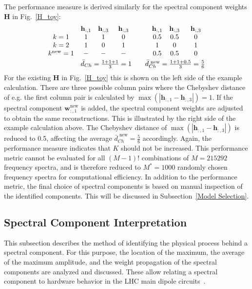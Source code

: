 \documentclass[lettersize,journal]{IEEEtran}
\begin{document}
The performance measure is derived similarly for the spectral component weights $\mathbf{H}$ in Fig.~\ref{H_toy}:
\begin{align*}
\begin{matrix}  
                    & \mathbf{h}_{:,1}   & \mathbf{h}_{:,3} & \mathbf{h}_{:,3} &&  & \mathbf{h}_{:,1}   & \mathbf{h}_{:,3} & \mathbf{h}_{:,3}\\ 
k=1                 & 1                 &  1              &  0              &&  & 0.5     &0.5      &0\\ 
k=2                 & 1                 &  0              &  1              &&  & 1       &0      &1\\
k^{\text{new}}=1    &       -           &         -       &  -              &&  & 0.5     &0.5      &0\\[1mm]
&\multicolumn{3}{c}{\bar{d}_{Ch}=\frac{1+1+1}{3}=1}         &&    \multicolumn{4}{c}{\bar{d}_{Ch}^{\text{ new}}=\frac{1+1+0.5}{3}=\frac{5}{6}}
\end{matrix}
\end{align*}
For the existing $\mathbf{H}$ in Fig.~\ref{H_toy} this is shown on the left side of the example calculation.
There are three possible column pairs where the Chebyshev distance of e.g. the first column pair is calculated by $\max(|\mathbf{h}_{:,1} -\mathbf{h}_{:,3}|)=1$.
If the spectral component $\mathbf{w}_{:,1}^{\text{new}}$ is added, the spectral component weights are adjusted to obtain the same reconstructions.
This is illustrated by the right side of the example calculation above.
The Chebyshev distance of $\max(|\mathbf{h}_{:,1} -\mathbf{h}_{:,3}|)$ is reduced to 0.5, affecting the average $\bar{d}_{Ch}^{\text{ new}}=\frac{5}{6}$ accordingly.
Again, the performance measure indicates that $K$ should not be increased.
This performance metric cannot be evaluated for all $(M-1)!$ combinations of $M=215292$ frequency spectra, and is therefore reduced to $M^*=1000$ randomly chosen frequency spectra for computational efficiency.
In addition to the performance metric, the final choice of spectral components is based on manual inspection of the identified components. This will be discussed in Subsection~\ref{Model Selection}.

\subsection{Spectral Component Interpretation} \label{Component Interpretation}
This subsection describes the method of identifying the physical process behind a spectral component.
For this purpose, the location of the maximum, the average of the maximum amplitude, and the weight propagation of the spectral components are analyzed and discussed. 
These allow relating a spectral component to hardware behavior in the LHC main dipole circuits~\cite{pearl2018book}.
\end{document}
